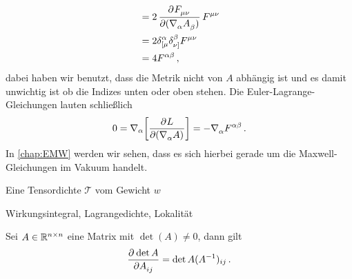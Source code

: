 \begin{beispiel}
\begin{equation}
\begin{split}
&=2\dpd{\tensor{F}{_\mu_\nu}}{(\tensor{\nabla}{_\alpha}\tensor{A}{_\beta})}\tensor{F}{^\mu^\nu}\\
&=2\tensor*{\delta}{^\alpha_[_\mu}\tensor*{\delta}{^\beta_\nu_]}\tensor{F}{^\mu^\nu}\\
&=4\tensor{F}{^\alpha^\beta}\,,
\end{split}
\end{equation}
dabei haben wir benutzt, dass die Metrik nicht von $A$ abhängig ist und es damit
unwichtig ist ob die Indizes unten oder oben stehen.
Die Euler-Lagrange-Gleichungen lauten schließlich
\begin{equation}
0=\nabla_\alpha\left[\dpd{L}{\left(\tensor{\nabla}{_\alpha}A\right)}\right]
=-\tensor{\nabla}{_\alpha}\tensor{F}{^\alpha^\beta}\,.
\end{equation}
In \autoref{chap:EMW} werden wir sehen, dass es sich hierbei gerade um die
Maxwell-Gleichungen im Vakuum handelt.
\end{beispiel}
\begin{definition}[Tensordichte]
Eine Tensordichte $\mathcal{T}$ vom Gewicht $w$
\end{definition}
Wirkungsintegral, Lagrangedichte, Lokalität
\begin{beispiel}
\end{beispiel}
\begin{lemma}
Sei $A\in \mathbb{R}^{n\times n}$ eine Matrix mit $\det(A)\neq 0$, dann gilt
\begin{equation}
\dpd{\det A}{A_{ij}}=\det A ({A^{-1}})_{ij}\,.
\end{equation}
\end{lemma}
